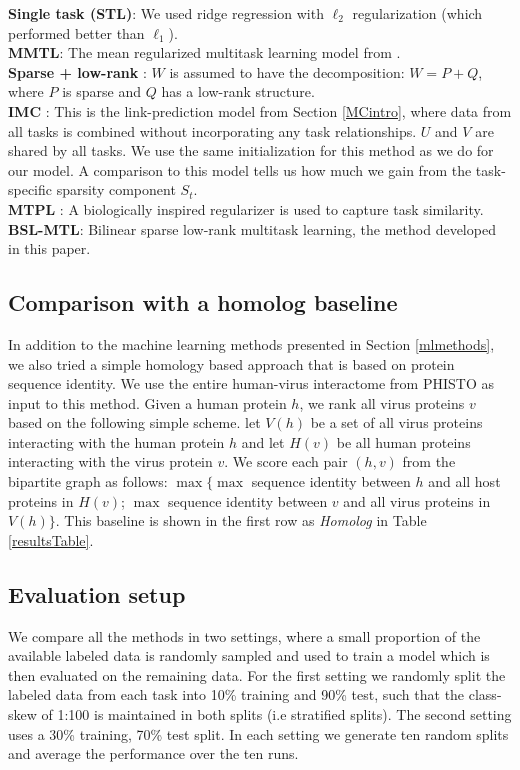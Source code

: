 \documentclass{bioinfo}
\begin{document}
\noindent\textbf{Single task (STL)}: We used ridge regression with $\ell_2$ regularization (which performed better than $\ell_1$). \\
\noindent\textbf{MMTL}: The mean regularized multitask learning model from \cite{pontil04}. \\
\noindent\textbf{Sparse + low-rank} \citep{chen2012}: $W$ is assumed to have the decomposition: $W = P + Q$, where $P$ is sparse and $Q$ has a low-rank structure. \\
\noindent\textbf{IMC} \citep{prateek,nagarajan}: This is the link-prediction model from Section \ref{MCintro}, where data from all tasks is combined without incorporating any task relationships. $U$ and $V$ are shared by all tasks. We use the same initialization for this method as we do for our model. A comparison to this model tells us how much we gain from the task-specific sparsity component $S_t$. \\
\noindent\textbf{MTPL} \citep{me_ismb_2013}: A biologically inspired regularizer is used to capture task similarity.\\ \noindent\textbf{BSL-MTL}: Bilinear sparse low-rank multitask learning, the method developed in this paper.



\subsection{Comparison with a homolog baseline}
In addition to the machine learning methods presented in Section \ref{mlmethods}, we also tried a simple homology based approach that is based on protein sequence identity. We use the entire human-virus interactome from PHISTO as input to this method. Given a human protein $h$, we rank all virus proteins $v$ based on the following simple scheme. let $V(h)$ be a set of all virus proteins interacting with the human protein $h$ and let $H(v)$ be all human proteins interacting with the virus protein $v$. We score each pair $(h, v)$ from the bipartite graph as follows: $\max \{ \max $ sequence identity between $h$ and all host proteins in $H(v)$; $\max $ sequence identity between $ v $ and all virus proteins in $V(h) \}$. This baseline is shown in the first row as \textit{Homolog} in Table \ref{resultsTable}.


\subsection{Evaluation setup}
We compare all the methods in two settings, where a small proportion of the available labeled data is randomly sampled and used to train a model which is then evaluated on the remaining data. For the first setting we randomly split the labeled data from each task into 10\% training and 90\% test, such that the class-skew of 1:100 is maintained in both splits (i.e stratified splits). The second setting uses a 30\% training, 70\% test split. 
In each setting we generate ten random splits and average the performance over the ten runs.
\end{document}
